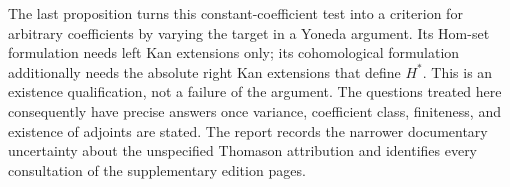 The last proposition turns this constant-coefficient test into a criterion for arbitrary coefficients by varying the target in a Yoneda argument. Its Hom-set formulation needs left Kan extensions only; its cohomological formulation additionally needs the absolute right Kan extensions that define $H^*$. This is an existence qualification, not a failure of the argument. The questions treated here consequently have precise answers once variance, coefficient class, finiteness, and existence of adjoints are stated. The report records the narrower documentary uncertainty about the unspecified Thomason attribution and identifies every consultation of the supplementary edition pages.
